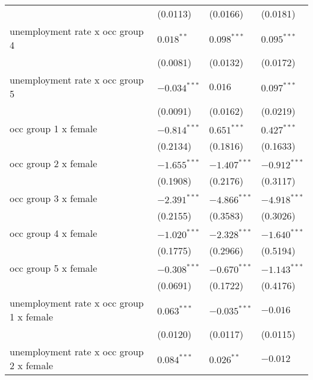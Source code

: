 \begin{tabular}{llll}
                                         &           (0.0113) &           (0.0166) &           (0.0181) \\
unemployment rate x occ group 4          &       $0.018^{**}$ &      $0.098^{***}$ &      $0.095^{***}$ \\
                                         &           (0.0081) &           (0.0132) &           (0.0172) \\
unemployment rate x occ group 5          &     $-0.034^{***}$ &            $0.016$ &      $0.097^{***}$ \\
                                         &           (0.0091) &           (0.0162) &           (0.0219) \\
occ group 1 x female                     &     $-0.814^{***}$ &      $0.651^{***}$ &      $0.427^{***}$ \\
                                         &           (0.2134) &           (0.1816) &           (0.1633) \\
occ group 2 x female                     &     $-1.655^{***}$ &     $-1.407^{***}$ &     $-0.912^{***}$ \\
                                         &           (0.1908) &           (0.2176) &           (0.3117) \\
occ group 3 x female                     &     $-2.391^{***}$ &     $-4.866^{***}$ &     $-4.918^{***}$ \\
                                         &           (0.2155) &           (0.3583) &           (0.3026) \\
occ group 4 x female                     &     $-1.020^{***}$ &     $-2.328^{***}$ &     $-1.640^{***}$ \\
                                         &           (0.1775) &           (0.2966) &           (0.5194) \\
occ group 5 x female                     &     $-0.308^{***}$ &     $-0.670^{***}$ &     $-1.143^{***}$ \\
                                         &           (0.0691) &           (0.1722) &           (0.4176) \\
unemployment rate x occ group 1 x female &      $0.063^{***}$ &     $-0.035^{***}$ &           $-0.016$ \\
                                         &           (0.0120) &           (0.0117) &           (0.0115) \\
unemployment rate x occ group 2 x female &      $0.084^{***}$ &       $0.026^{**}$ &           $-0.012$ \\

\end{tabular}
